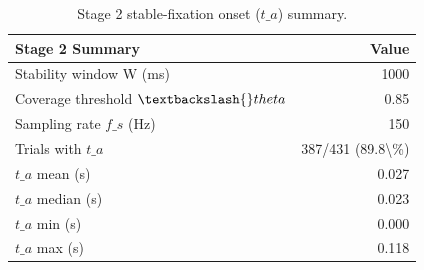 \begin{table}[t]
\centering
\caption{Stage 2 stable-fixation onset ($t\_a$) summary.}
\label{tab:ta-summary}
\begin{tabular}{lr}
\hline
Stage 2 Summary & Value \\ \hline
Stability window W (ms) & 1000 \\ \hline
Coverage threshold $\textbackslash{}theta$ & 0.85 \\ \hline
Sampling rate $f\_s$ (Hz) & 150 \\ \hline
Trials with $t\_a$ & 387/431 (89.8\textbackslash{}\%) \\ \hline
$t\_a$ mean (s) & 0.027 \\ \hline
$t\_a$ median (s) & 0.023 \\ \hline
$t\_a$ min (s) & 0.000 \\ \hline
$t\_a$ max (s) & 0.118 \\ \hline
\end{tabular}
\end{table}
